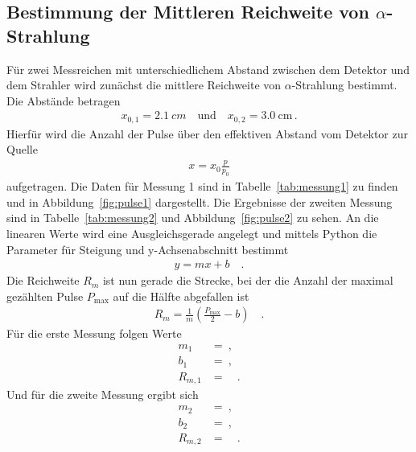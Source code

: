 \subsection{Bestimmung der Mittleren Reichweite von $\alpha$-Strahlung} \label{sec:reichweite}
Für zwei Messreichen mit unterschiedlichem Abstand zwischen dem Detektor und dem Strahler wird zunächst die mittlere Reichweite von $\alpha$-Strahlung bestimmt. Die Abstände betragen
\begin{align*}
	x_{0,1} = \SI{2,1}{cm} \quad \text{und} \quad x_{0,2} = \SI{3,0}{\centi\meter} \, .
\end{align*}
Hierfür wird die Anzahl der Pulse über den effektiven Abstand vom Detektor zur Quelle
\begin{align}
	x = x_0 \frac{p}{p_0}
\end{align}
aufgetragen. Die Daten für Messung 1 sind in Tabelle~\ref{tab:messung1} zu finden und in Abbildung~\ref{fig:pulse1} dargestellt. Die Ergebnisse der zweiten Messung sind in Tabelle~\ref{tab:messung2} und Abbildung~\ref{fig:pulse2} zu sehen.  An die linearen Werte wird eine Ausgleichsgerade angelegt und mittels Python die Parameter für Steigung und y-Achsenabschnitt bestimmt
\begin{align}
	y = mx +b \quad .
\end{align}
Die Reichweite $R_m$ ist nun gerade die Strecke, bei der die Anzahl der maximal gezählten Pulse $P_\text{max}$  auf die Hälfte abgefallen ist
\begin{align}
	R_m = \frac{1}{m} \left(\frac{P_\text{max}}{2} -b \right) \quad .
\end{align}
Für die erste Messung folgen Werte
\begin{align}
	m_1 &=  \ , \\
	b_1 &=  \ , \\
	R_{m,1} &=  \quad.
\end{align}
Und für die zweite Messung ergibt sich
\begin{align}
	m_2 &=  \ , \\
	b_2 &=  \ , \\
	R_{m,2} &=  \quad.
\end{align}

